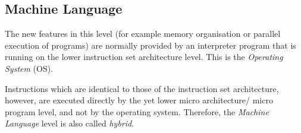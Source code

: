%
%
%
%
%
%
%

\subsection{Machine Language}
\label{machine_language_heading}

The new features in this level (for example memory organisation or parallel
execution of programs) are normally provided by an interpreter program that is
running on the lower instruction set architecture level. This is the
\emph{Operating System} (OS).

Instructions which are identical to those of the instruction set architecture,
however, are executed directly by the yet lower micro architecture/ micro
program level, and not by the operating system. Therefore, the
\emph{Machine Language} level is also called \emph{hybrid}.
